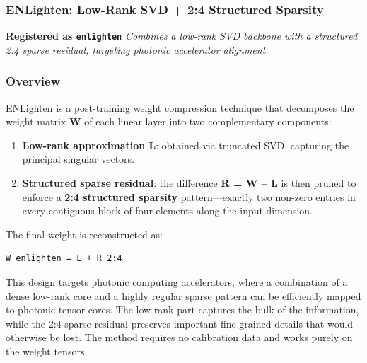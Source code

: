 \subsubsection*{ENLighten: Low-Rank SVD + 2:4 Structured Sparsity}

\textbf{Registered as \texttt{enlighten}}
\textit{Combines a low-rank SVD backbone with a structured 2:4 sparse residual, targeting photonic accelerator alignment.}


\subsubsection*{Overview}

ENLighten is a post-training weight compression technique that decomposes the weight matrix \textbf{W} of each linear layer into two complementary components:

\begin{enumerate}
\item \textbf{Low-rank approximation L}: obtained via truncated SVD, capturing the principal singular vectors.
\item \textbf{Structured sparse residual}: the difference \textbf{R = W -- L} is then pruned to enforce a \textbf{2:4 structured sparsity} pattern---exactly two non-zero entries in every contiguous block of four elements along the input dimension.

\end{enumerate}
The final weight is reconstructed as:

\vspace{0.5em}
\begin{mdframed}[backgroundcolor=codebg, linecolor=codeframe, linewidth=1pt, roundcorner=4pt, innerleftmargin=2pt, innerrightmargin=5pt, innertopmargin=5pt, innerbottommargin=5pt]
\begin{lstlisting}
W_enlighten = L + R_2:4
\end{lstlisting}
\end{mdframed}
\vspace{0.5em}

This design targets photonic computing accelerators, where a combination of a dense low-rank core and a highly regular sparse pattern can be efficiently mapped to photonic tensor cores. The low-rank part captures the bulk of the information, while the 2:4 sparse residual preserves important fine-grained details that would otherwise be lost. The method requires no calibration data and works purely on the weight tensors.

